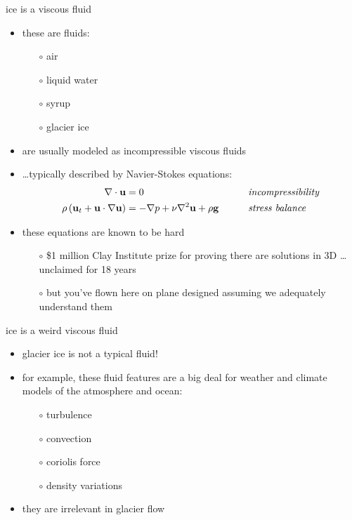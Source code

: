 \documentclass[10pt,hyperref={pdfpagelabels=true}]{beamer}
\begin{document}
\begin{frame}{ice is a viscous fluid}

\begin{itemize}
\item these are fluids:
  \begin{itemize}
  \item[$\circ$] air
  \item[$\circ$] liquid water
  \item[$\circ$] syrup
  \item[$\circ$] glacier ice
  \end{itemize}
\item are usually modeled as \alert{incompressible viscous fluids}
\item \dots typically described by Navier-Stokes equations:
\begin{align*}
\nabla \cdot \mathbf{u} &= 0 &&\qquad \text{\emph{incompressibility}} \\
\rho \left(\mathbf{u}_t + \mathbf{u}\cdot\nabla \mathbf{u}\right) &= -\nabla p + \nu \nabla^2 \mathbf{u} + \rho \mathbf{g} &&\qquad \text{\emph{stress balance}}
\end{align*}

\small
\item these equations are known to be hard
  \begin{itemize}
  \item[$\circ$] \$1 million Clay Institute prize for proving there are solutions in 3D \dots unclaimed for 18 years
  \item[$\circ$] but you've flown here on plane designed assuming we adequately understand them
  \end{itemize}
\end{itemize}
\end{frame}


\begin{frame}{ice is a weird viscous fluid}

\begin{itemize}
\item glacier ice is not a typical fluid!
\item for example, these fluid features are a big deal for weather and climate models of the atmosphere and ocean:
  \begin{itemize}
  \item[$\circ$] turbulence
  \item[$\circ$] convection
  \item[$\circ$] coriolis force
  \item[$\circ$] density variations
  \end{itemize}
\item they are \alert{irrelevant in glacier flow}
\end{itemize}
\end{frame}
\end{document}
